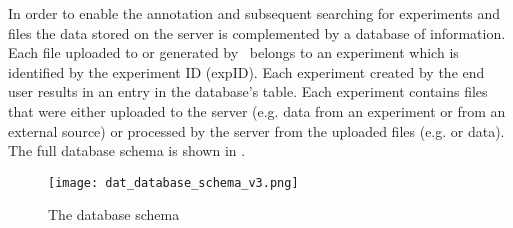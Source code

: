 In order to enable the annotation and subsequent searching for experiments and files the data stored on the server is complemented by a database of information. Each file uploaded to or generated by \appName\ belongs to an experiment which is identified by the experiment ID (expID). Each experiment created by the end user results in an entry in the database's  table. Each experiment contains files that were either uploaded to the server (e.g.  data from an experiment or from an external source) or processed by the server from the uploaded files (e.g.  or  data). The full database schema is shown in .

\begin{figure}[p]
\centering
\texttt{[image: dat\_database\_schema\_v3.png]}
\caption{The database schema}
\label{fig:dat_databaseSchema}
\end{figure}

\FloatBarrier

